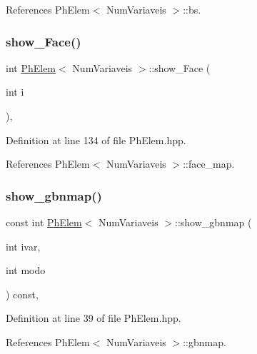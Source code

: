 References Ph\+Elem$<$ Num\+Variaveis $>$\+::bs.

\mbox{\label{classPhElem_a916c6927d0964574d815a13dd80f1e30}} 
\subsubsection{\texorpdfstring{show\+\_\+\+Face()}{show\_Face()}}
{\footnotesize\ttfamily int \hyperlink{classPhElem}{Ph\+Elem}$<$ Num\+Variaveis $>$\+::show\+\_\+\+Face (\begin{DoxyParamCaption}\item[{int}]{i }\end{DoxyParamCaption})\hspace{0.3cm}{\ttfamily [inline]}, {\ttfamily [inherited]}}



Definition at line 134 of file Ph\+Elem.\+hpp.



References Ph\+Elem$<$ Num\+Variaveis $>$\+::face\+\_\+map.

\mbox{\label{classPhElem_a878851914f553298700437c5c8aef4dd}} 
\subsubsection{\texorpdfstring{show\+\_\+gbnmap()}{show\_gbnmap()}}
{\footnotesize\ttfamily const int \hyperlink{classPhElem}{Ph\+Elem}$<$ Num\+Variaveis $>$\+::show\+\_\+gbnmap (\begin{DoxyParamCaption}\item[{int}]{ivar,  }\item[{int}]{modo }\end{DoxyParamCaption}) const\hspace{0.3cm}{\ttfamily [inline]}, {\ttfamily [inherited]}}



Definition at line 39 of file Ph\+Elem.\+hpp.



References Ph\+Elem$<$ Num\+Variaveis $>$\+::gbnmap.

\mbox{\label{classPhElem_a2addc4d79151aeac865e2255be3b417d}} 
